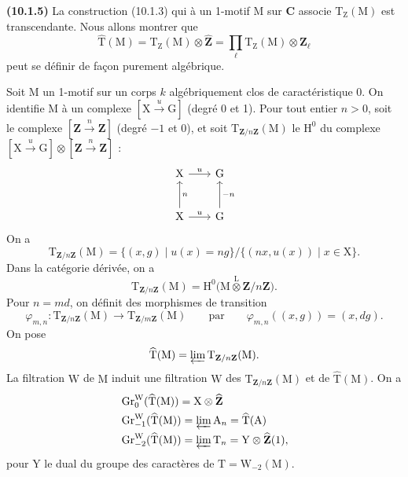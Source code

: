 \documentclass[11pt,leqno]{article}
\newcommand{\Page}[1]{\ifvmode\noindent\else\unskip\ \fi{\footnotesize\textcolor{gray}{[p.\,#1]}}\ \ignorespaces}
\begin{document}
\textbf{(10.1.5)} La construction (10.1.3) qui à un 1-motif
\(\mathrm{M}\) sur \(\mathbf{C}\) associe
\(\mathrm{T}_{\mathrm{Z}}(\mathrm{M})\) est transcendante.
Nous allons montrer que
\[
\widehat{\mathrm{T}}(\mathrm{M})
=\mathrm{T}_{\mathrm{Z}}(\mathrm{M})\otimes\widehat{\mathbf{Z}}
=\prod_{\ell}\mathrm{T}_{\mathrm{Z}}(\mathrm{M})\otimes\mathbf{Z}_{\ell}
\]
peut se définir de façon purement algébrique.

Soit \(\mathrm{M}\) un 1-motif sur un corps \(k\) algébriquement clos
de caractéristique 0. On identifie \(\mathrm{M}\) à un complexe
\([\mathrm{X}\xrightarrow{u}\mathrm{G}]\) (degré 0 et 1).
Pour tout entier \(n>0\), soit le complexe
\([\mathbf{Z}\xrightarrow{n}\mathbf{Z}]\) (degré \(-1\) et 0),
et soit \(\mathrm{T}_{\mathbf{Z}/n\mathbf{Z}}(\mathrm{M})\) le
\(\mathrm{H}^0\) du complexe
\([\mathrm{X}\xrightarrow{u}\mathrm{G}]
\otimes[\mathbf{Z}\xrightarrow{n}\mathbf{Z}]\) :
\Page{57}
\[
\begin{tikzcd}[column sep=2em, row sep=2.5em]
\mathrm{X} \arrow[r, "u"] & \mathrm{G}
\\
\mathrm{X} \arrow[r, "u"] \arrow[u, "n"']
& \mathrm{G} \arrow[u, "-n"']
\end{tikzcd}
\]
On a
\[
\mathrm{T}_{\mathbf{Z}/n\mathbf{Z}}(\mathrm{M})
=\{(x,g)\mid u(x)=ng\}/\{(nx,u(x))\mid x\in\mathrm{X}\}.
\]
Dans la catégorie dérivée, on a
\[
\mathrm{T}_{\mathbf{Z}/n\mathbf{Z}}(\mathrm{M})
=\mathrm{H}^0
\bigl(\mathrm{M}\overset{\mathrm{L}}{\otimes}\mathbf{Z}/n\mathbf{Z}\bigr).
\]
Pour \(n=md\), on définit des morphismes de transition
\[
\varphi_{m,n}:
\mathrm{T}_{\mathbf{Z}/n\mathbf{Z}}(\mathrm{M})
\to\mathrm{T}_{\mathbf{Z}/m\mathbf{Z}}(\mathrm{M})
\qquad\text{par}\qquad
\varphi_{m,n}((x,g))=(x,dg).
\]
On pose
\[
\widehat{\mathrm{T}}(\mathrm{M})
=\varprojlim\mathrm{T}_{\mathbf{Z}/n\mathbf{Z}}(\mathrm{M}).
\]
La filtration \(\mathrm{W}\) de \(\mathrm{M}\) induit une filtration
\(\mathrm{W}\) des
\(\mathrm{T}_{\mathbf{Z}/n\mathbf{Z}}(\mathrm{M})\) et de
\(\widehat{\mathrm{T}}(\mathrm{M})\). On a
\[
\begin{aligned}
&\operatorname{Gr}^{\mathrm{W}}_0(\widehat{\mathrm{T}}(\mathrm{M}))
  =\mathrm{X}\otimes\widehat{\mathbf{Z}}
\\
&\operatorname{Gr}^{\mathrm{W}}_{-1}(\widehat{\mathrm{T}}(\mathrm{M}))
  =\varprojlim\mathrm{A}_n=\widehat{\mathrm{T}}(\mathrm{A})
\\
&\operatorname{Gr}^{\mathrm{W}}_{-2}(\widehat{\mathrm{T}}(\mathrm{M}))
  =\varprojlim\mathrm{T}_n=\mathrm{Y}\otimes\widehat{\mathbf{Z}}(1),
\end{aligned}
\]
pour \(\mathrm{Y}\) le dual du groupe des caractères de
\(\mathrm{T}=\mathrm{W}_{-2}(\mathrm{M})\).
\end{document}
